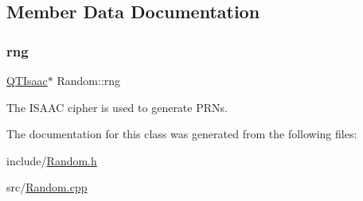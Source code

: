 \subsection{Member Data Documentation}
\mbox{\label{classRandom_ac7e446b9b431641c729a6d78ab747781}} 
\subsubsection{\texorpdfstring{rng}{rng}}
{\footnotesize\ttfamily \hyperlink{classQTIsaac}{Q\+T\+Isaac}$\ast$ Random\+::rng\hspace{0.3cm}{\ttfamily [private]}}

The I\+S\+A\+AC cipher is used to generate P\+R\+Ns. 

The documentation for this class was generated from the following files\+:\begin{DoxyCompactItemize}
\item 
include/\hyperlink{Random_8h}{Random.\+h}\item 
src/\hyperlink{Random_8cpp}{Random.\+cpp}\end{DoxyCompactItemize}
